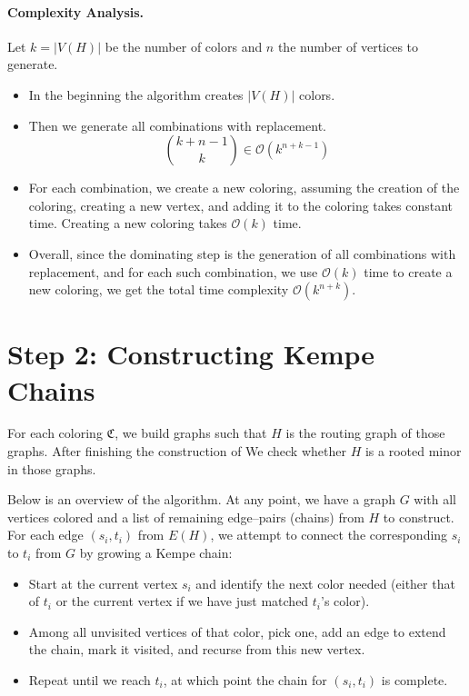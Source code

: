 \paragraph{Complexity Analysis.}
Let \( k = |V(H)| \) be the number of colors and \( n \) the number of vertices to generate.

\begin{itemize}
    \item In the beginning the algorithm creates $|V(H)|$ colors.
    
    \item Then we generate all combinations with replacement.
    \[
        \binom{k + n - 1}{k} \in \mathcal{O}(k^{n + k - 1})
    \]
    \item 
 For each combination, we create a new coloring, assuming the creation of the coloring,  
 creating a new vertex, and adding it to the coloring takes constant time. Creating a new coloring
 takes $\mathcal{O}(k)$ time.
    
    \item Overall, since the dominating step is the generation of all combinations with replacement, and for each such combination, 
 we use $\mathcal{O}(k)$ time to create a new coloring, we get the total time complexity \( \mathcal{O}(k^{n+k}) \).
\end{itemize}


\section{Step 2: Constructing Kempe Chains}

For each coloring $\mathfrak{C}$, we build graphs such that $H$ is the routing graph of those graphs. After finishing the construction of 
We check whether $H$ is a rooted minor in those graphs.

Below is an overview of the algorithm. At any point, we have a graph $G$ with all vertices colored and a list of remaining edge–pairs (chains) from $H$ to construct. For each edge $(s_i,t_i)$ from $E(H)$, we attempt to connect the corresponding $s_i$ to $t_i$ from $G$ by growing a Kempe chain:

\begin{itemize}
    \item Start at the current vertex $s_i$ and identify the next color needed (either that of $t_i$ or the current vertex if we have just matched $ t_i$'s color).
    \item Among all unvisited vertices of that color, pick one, add an edge to extend the chain, mark it visited, and recurse from this new vertex.
    \item Repeat until we reach $t_i$, at which point the chain for $(s_i,t_i)$ is complete.
\end{itemize}

